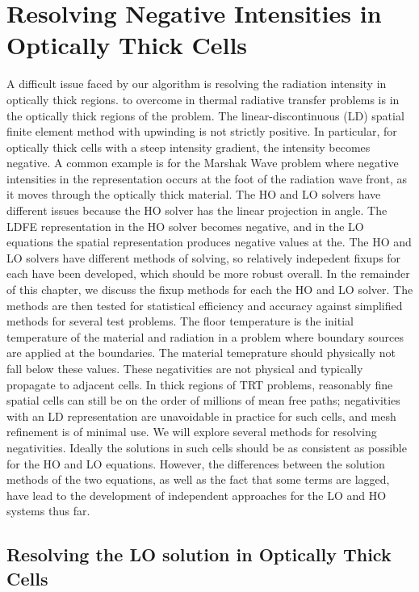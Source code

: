 

\section{Resolving Negative Intensities in Optically Thick Cells}

A difficult issue faced by our algorithm is resolving the radiation intensity
in optically thick regions. to overcome in thermal radiative transfer
problems is in the optically thick regions of the problem.  
The linear-discontinuous (LD) spatial finite element method with upwinding is not
strictly positive.  In particular, for optically thick cells with a steep intensity
gradient, the intensity becomes negative. A common example is for the Marshak Wave
problem where negative
intensities in the representation occurs at the foot of the radiation wave front, as
it moves through the optically thick material.   The HO and LO solvers have different
issues because the HO solver has the linear projection in angle.
The LDFE
representation in the HO solver becomes negative, and in the LO equations the
spatial representation produces negative values at the.  The HO and LO solvers
have different methods of solving, so relatively indepedent fixups for each have been
developed, which should be more robust overall.
In the remainder of this chapter, we discuss the fixup methods for each the HO and LO
solver.  The methods are then tested for statistical efficiency and accuracy against
simplified methods for several test problems.
  The floor temperature is the initial
temperature of the material and radiation in a problem where boundary sources are
applied at the boundaries.  The material temeprature should physically not fall below
these values.  These negativities are not physical and typically propagate to
adjacent cells. In thick regions of
TRT problems, reasonably fine spatial cells can still be on the order of millions of mean
free paths; negativities with an LD representation are unavoidable in practice for
such cells, and mesh refinement is of minimal use.  We will explore several methods
for resolving negativities.  Ideally the solutions in
such cells should be as consistent as possible for the HO and LO equations.  However,
the differences between the solution methods of the two equations, as well as the
fact that some terms are lagged, have lead to the development of independent
approaches for the LO and HO systems thus far.



\subsection{Resolving the LO solution in Optically Thick Cells}
\label{sec:negs}

